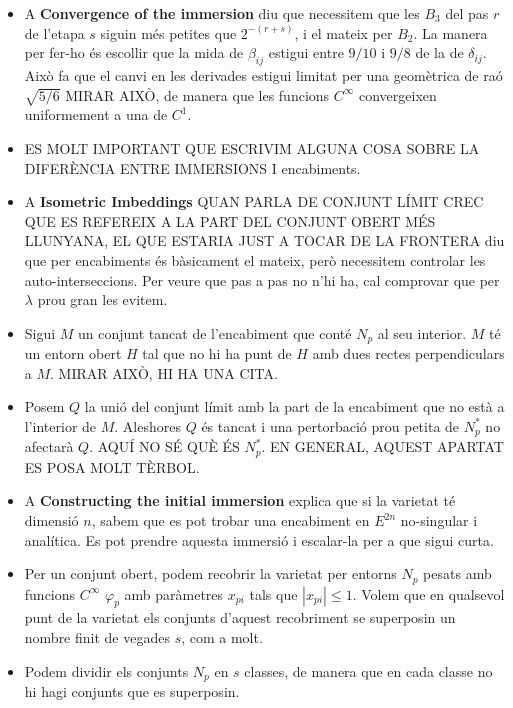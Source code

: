 {\begin{itemize}
\begin{itemize}
            \item[$\bullet$] Si la varietat és oberta, hi ha un nombre infinit de passos per etapa, però a cada porció compacta hi ha un nombre finit.
        \end{itemize}
    \item A \textbf{Convergence of the immersion} diu que necessitem que les $B_3$ del pas $r$ de l'etapa $s$ siguin més petites que $2^{-(r+s)}$, i el mateix per $B_2$. La manera per fer-ho és escollir que la mida de $\beta_{ij}$ estigui entre $9/10$ i $9/8$ de la de $\delta_{ij}$. Això fa que el canvi en les derivades estigui limitat per una geomètrica de raó $\sqrt{5/6}$ MIRAR AIXÒ, de manera que les funcions $C^\infty$ convergeixen uniformement a una de $C^1$.
    \item ES MOLT IMPORTANT QUE ESCRIVIM ALGUNA COSA SOBRE LA DIFERÈNCIA ENTRE IMMERSIONS I encabiments.
    \item A \textbf{Isometric Imbeddings} {\color{black} QUAN PARLA DE CONJUNT LÍMIT CREC QUE ES REFEREIX A LA PART DEL CONJUNT OBERT MÉS LLUNYANA, EL QUE ESTARIA JUST A TOCAR DE LA FRONTERA} diu que per encabiments és bàsicament el mateix, però necessitem controlar les auto-interseccions. Per veure que pas a pas no n'hi ha, cal comprovar que per $\lambda$ prou gran les evitem. 
    \item Sigui $M$ un conjunt tancat de l'encabiment que conté $N_p$ al seu interior. $M$ té un entorn obert $H$ tal que no hi ha punt de $H$ amb dues rectes perpendiculars a $M$. MIRAR AIXÒ, HI HA UNA CITA.
    \item Posem $Q$ la unió del conjunt límit amb la part de la encabiment que no està a l'interior de $M$. Aleshores $Q$ és tancat i una pertorbació prou petita de $N_p^*$ no afectarà $Q$. AQUÍ NO SÉ QUÈ ÉS $N_p^*$. EN GENERAL, AQUEST APARTAT ES POSA MOLT TÈRBOL. 
    \item A \textbf{Constructing the initial immersion} explica que si la varietat té dimensió $n$, sabem que es pot trobar una encabiment en $E^{2n}$ no-singular i analítica. Es pot prendre aquesta immersió i escalar-la per a que sigui curta. 
    \item Per un conjunt obert, podem recobrir la varietat per entorns $N_p$ pesats amb funcions $C^\infty$ $\varphi_p$ amb paràmetres $x_{pi}$ tals que $|x_{pi}|\le1$. Volem que en qualsevol punt de la varietat els conjunts d'aquest recobriment se superposin un nombre finit de vegades $s$, com a molt.
    \item Podem dividir els conjunts $N_p$ en $s$ classes, de manera que en cada classe no hi hagi conjunts que es superposin. 

\end{itemize}}
